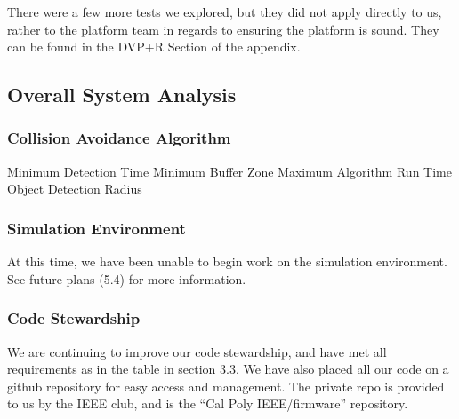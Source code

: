\documentclass[12pt]{article}
\begin{document}
There were a few more tests we explored, but they did not apply directly to us, rather to the platform team in regards to ensuring the platform is sound. They can be found in the DVP+R Section of the appendix.

\subsection{Overall System Analysis}
\subsubsection{Collision Avoidance Algorithm}
Minimum Detection Time
Minimum Buffer Zone
Maximum Algorithm Run Time
Object Detection Radius

\subsubsection{Simulation Environment}
At this time, we have been unable to begin work on the simulation environment. See future plans (5.4) for more information.

\subsubsection{Code Stewardship}
We are continuing to improve our code stewardship, and have met all requirements as in the table in section 3.3. We have also placed all our code on a github repository for easy access and management. The private repo is provided to us by the IEEE club, and is the “Cal Poly IEEE/firmware” repository.
\end{document}
